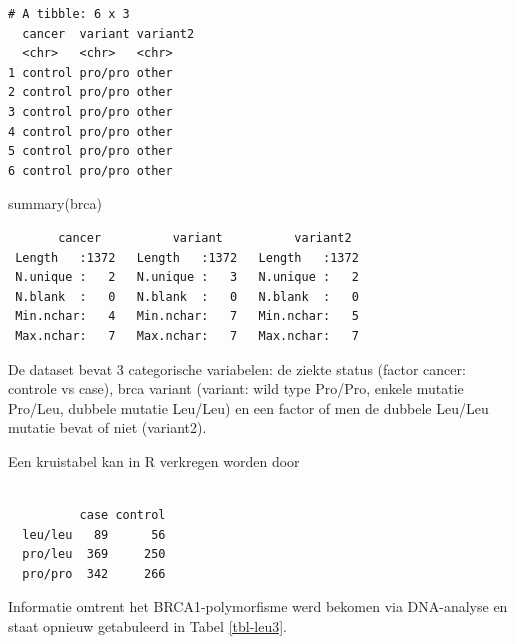 \documentclass[
  dutch,
  letterpaper,
  12pt]{book}
\newenvironment{Shaded}{\begin{snugshade}}{\end{snugshade}}
\newcommand{\FunctionTok}[1]{\textcolor[rgb]{0.28,0.35,0.67}{#1}}
\newcommand{\NormalTok}[1]{\textcolor[rgb]{0.00,0.23,0.31}{#1}}
\newcommand{\OtherTok}[1]{\textcolor[rgb]{0.00,0.23,0.31}{#1}}
\newcommand{\SpecialCharTok}[1]{\textcolor[rgb]{0.37,0.37,0.37}{#1}}
\theoremstyle{definition}
\theoremstyle{definition}
\theoremstyle{definition}
\theoremstyle{remark}
\begin{document}
\begin{verbatim}
# A tibble: 6 x 3
  cancer  variant variant2
  <chr>   <chr>   <chr>   
1 control pro/pro other   
2 control pro/pro other   
3 control pro/pro other   
4 control pro/pro other   
5 control pro/pro other   
6 control pro/pro other   
\end{verbatim}

\begin{Shaded}
\begin{Highlighting}[]
\FunctionTok{summary}\NormalTok{(brca)}
\end{Highlighting}
\end{Shaded}

\begin{verbatim}
       cancer          variant          variant2   
 Length   :1372   Length   :1372   Length   :1372  
 N.unique :   2   N.unique :   3   N.unique :   2  
 N.blank  :   0   N.blank  :   0   N.blank  :   0  
 Min.nchar:   4   Min.nchar:   7   Min.nchar:   5  
 Max.nchar:   7   Max.nchar:   7   Max.nchar:   7  
\end{verbatim}

De dataset bevat 3 categorische variabelen: de ziekte status (factor
cancer: controle vs case), brca variant (variant: wild type Pro/Pro,
enkele mutatie Pro/Leu, dubbele mutatie Leu/Leu) en een factor of men de
dubbele Leu/Leu mutatie bevat of niet (variant2).

Een kruistabel kan in R verkregen worden door

\begin{Shaded}
\end{Shaded}

\begin{verbatim}
         
          case control
  leu/leu   89      56
  pro/leu  369     250
  pro/pro  342     266
\end{verbatim}

Informatie omtrent het BRCA1-polymorfisme werd bekomen via DNA-analyse
en staat opnieuw getabuleerd in Tabel \ref{tbl-leu3}.
\end{document}
